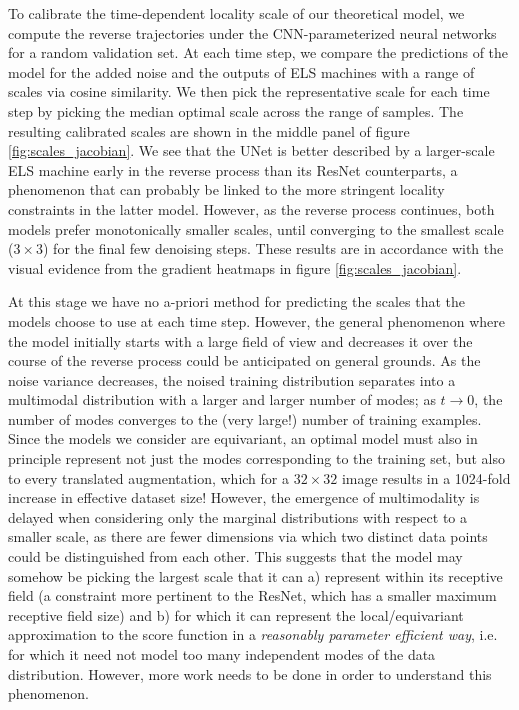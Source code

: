 \documentclass{article}
\theoremstyle{plain}
\theoremstyle{definition}
\theoremstyle{remark}
\begin{document}
To calibrate the time-dependent locality scale of our theoretical model, we compute the reverse trajectories under the CNN-parameterized neural networks for a random validation set. At each time step, we compare the predictions of the model for the added noise and the outputs of ELS machines with a range of scales via cosine similarity. We then pick the representative scale for each time step by picking the median optimal scale across the range of samples. The resulting calibrated scales are shown in the middle panel of figure \ref{fig:scales_jacobian}. We see that the UNet is better described by a larger-scale ELS machine early in the reverse process than its ResNet counterparts, a phenomenon that can probably be linked to the more stringent locality constraints in the latter model. However, as the reverse process continues, both models prefer monotonically smaller scales, until converging to the smallest scale ($3 \times 3$) for the final few denoising steps. These results are in accordance with the visual evidence from the gradient heatmaps in figure \ref{fig:scales_jacobian}.

At this stage we have no a-priori method for predicting the scales that the models choose to use at each time step. However, the general phenomenon where the model initially starts with a large field of view and decreases it over the course of the reverse process could be anticipated on general grounds. As the noise variance decreases, the noised training distribution separates into a multimodal distribution with a larger and larger number of modes; as $t \to 0$, the number of modes converges to the (very large!) number of training examples. Since the models we consider are equivariant, an optimal model must also in principle represent not just the modes corresponding to the training set, but also to every translated augmentation, which for a $32 \times 32$ image results in a 1024-fold increase in effective dataset size! However, the emergence of multimodality is delayed when considering only the marginal distributions with respect to a smaller scale, as there are fewer dimensions via which two distinct data points could be distinguished from each other. This suggests that the model may somehow be picking the largest scale that it can a) represent within its receptive field (a constraint more pertinent to the ResNet, which has a smaller maximum receptive field size) and b) for which it can represent the local/equivariant approximation to the score function in a \textit{reasonably parameter efficient way}, i.e. for which it need not model too many independent modes of the data distribution. However, more work needs to be done in order to understand this phenomenon. 
\end{document}
